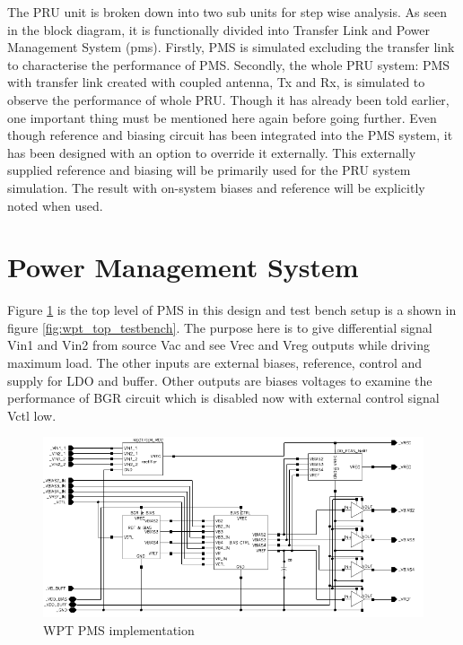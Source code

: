 \documentclass[12pt,a4paper,UKenglish]{article}
\begin{document}
The PRU unit is broken down into two sub units for step wise analysis. As seen in the block diagram, it is functionally divided into Transfer Link and 
Power Management System (\acrshort{pms}). Firstly, PMS is simulated excluding the transfer link to characterise the performance of PMS. Secondly, the whole PRU system: PMS with transfer link created with coupled antenna, Tx and Rx, is simulated to observe the performance of whole PRU. Though it has already been told earlier, 
one important thing must be mentioned here again before going further. Even though reference and biasing circuit has 
been integrated into the PMS system, it has been designed with an option to override it externally. This externally 
supplied reference and biasing will be primarily used for the PRU system simulation. The result with on-system biases 
and reference will be explicitly noted when used. \\

\section{Power Management System}

Figure \ref{fig:wpt_top} is the top level of PMS in this design and test bench setup is a shown in figure \ref{fig:wpt_top_testbench}. The purpose here is to give differential signal Vin1 and Vin2 from source Vac and see Vrec and Vreg outputs while driving maximum load. The other inputs are external biases, reference, control and supply for LDO and buffer. Other outputs are biases voltages to examine the performance of BGR circuit which is disabled now with external control signal Vctl low.  \\

\begin{figure} [H]
  \centering
  \includegraphics[width=\textwidth]{img/wpt_top.pdf} 
 \caption{WPT PMS implementation} 
\label{fig:wpt_top} 
\end{figure}
\end{document}
